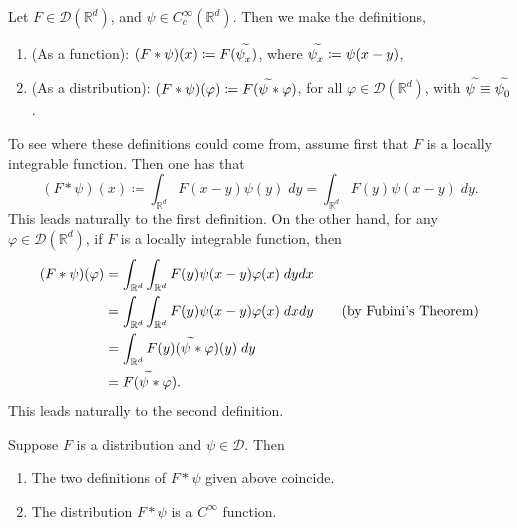 \documentclass{article}
\begin{document}
\begin{definition}
	Let $F \in \mathcal{D}(\mathbb{R}^{d})$, and $\psi \in C_{c}^{\infty}(\mathbb{R}^{d})$. Then we make the definitions, \vspace{-1.2em}
	\begin{enumerate}[itemsep =-2pt]
		\item (As a function): $(F \ast \psi)(x) \coloneqq F(\psi^{\widetilde{}}_{x})$, where $\psi_{x}^{\widetilde{}} \coloneqq \psi(x - y)$, 
		\item (As a distribution): $(F \ast \psi)(\varphi) \coloneqq F(\psi^{\widetilde{}} \ast \varphi)$, for all $\varphi \in \mathcal{D}(\mathbb{R}^{d})$, with $\psi^{\widetilde{}} \equiv \psi^{\widetilde{}}_{0}$. 
	\end{enumerate}
\end{definition} 

To see where these definitions could come from, assume first that $F$ is a locally integrable function. Then one has that 
\begin{equation*}
	(F \ast \psi)(x) \coloneqq \int_{\mathbb{R}^{d}}F(x - y)\psi(y)\;dy = \int_{\mathbb{R}^{d}}F(y)\psi(x - y)\;dy. 
\end{equation*}
This leads naturally to the first definition. On the other hand, for any $\varphi \in \mathcal{D}(\mathbb{R}^{d})$, if $F$ is a locally integrable function, then 
\begin{align*}
	\begin{split}
		(F \ast \psi)(\varphi) &= \int_{\mathbb{R}^{d}}\int_{\mathbb{R}^{d}}F(y)\psi(x - y)\varphi(x)\;dydx \\
		&= \int_{\mathbb{R}^{d}}\int_{\mathbb{R}^{d}}F(y)\psi(x - y)\varphi(x)\;dxdy \qquad (\text{by Fubini's Theorem}) \\
		&= \int_{\mathbb{R}^{d}}F(y)(\psi^{\widetilde{}}\ast \varphi)(y)\;dy  \\
		&= F(\psi^{\widetilde{}} \ast \varphi). 
	\end{split} 
\end{align*}
This leads naturally to the second definition. 

\begin{prop}
	Suppose $F$ is a distribution and $\psi \in \mathcal{D}$. Then \vspace{-1.75em}
	\begin{enumerate}[itemsep =-2pt]
		\item The two definitions of $F \ast \psi$ given above coincide. 
		\item The distribution $F \ast \psi$ is a $C^{\infty}$ function. 
	\end{enumerate}
\end{prop}
\end{document}
